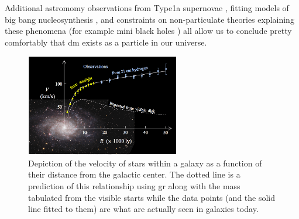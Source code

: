 Additional astromomy observations from Type1a supernovae \cite{type1a-supernova-2010}, fitting
models of big bang nucleosynthesis \cite{nucleosynthesis-1998}, and constraints on non-particulate
theories explaining these phenomena (for example mini black holes
\cite{constraints-primordial-black-holes-2021})
all allow us to conclude pretty comfortably that \ac{dm} exists as a particle in our universe.

\begin{figure}
	\centering
	\includegraphics[width=0.6\textwidth]{figures/theory/rotation-curve-evidence-for-dm.png}
	\caption{
		Depiction of the velocity of stars within a galaxy as a function of their distance
		from the galactic center. The dotted line is a prediction of this relationship using
		\ac{gr} along with the mass tabulated from the visible starts while the data points
		(and the solid line fitted to them) are what are actually seen in galaxies today.
	}
	\label{fig:rotation-curve}
\end{figure}

